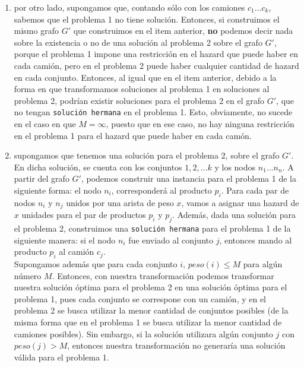 \documentclass[11pt, a4paper, twoside]{article}
\begin{document}
\begin{enumerate}
\begin{enumerate}
			      \item por otro lado, supongamos que, contando sólo con los camiones $c_{1} \dots c_{k}$, sabemos
			      que el problema 1 no tiene solución. Entonces, si construimos el mismo grafo $G'$ que construimos
			      en el item anterior, \textbf{no} podemos decir nada sobre la existencia o no de una solución
			      al problema 2 sobre el grafo $G'$, porque el problema 1 impone una restricción en el hazard que
			      puede haber en cada camión, pero en el problema 2 puede haber cualquier cantidad de hazard en cada
			      conjunto. Entonces, al igual que en el item anterior, debido a la forma en que transformamos soluciones
			      al problema 1 en soluciones al problema 2, podrían existir soluciones para el problema 2
			      en el grafo $G'$, que no tengan \texttt{solución hermana} en el problema 1. Esto, obviamente, no sucede
			      en el caso en que $M = \infty$, puesto que en ese caso, no hay ninguna restricción en el problema 1
			      para el hazard que puede haber en cada camón. 
			      
			      \item supongamos que tenemos una solución para el problema 2, sobre el grafo $G'$. En dicha 
			      solución, se cuenta con
			      los conjuntos $1, 2, \dots k$ y los nodos $n_{1} \dots n_{n}$. A partir del grafo $G'$, podemos
			      construir una instancia para el problema 1 de la siguiente forma: el nodo $n_{i}$, corresponderá
			      al producto $p_{i}$. Para cada par de nodos $n_{i}$ y $n_{j}$ unidos por una arista de peso $x$,
			      vamos a asignar una hazard de $x$ unidades para el par de productos $p_{i}$ y $p_{j}$. Además,
			      dada una solución para el problema 2, construimos una \texttt{solución hermana} para el problema 1
			      de la siguiente manera: si el nodo $n_{i}$ fue enviado al conjunto $j$, entonces mando al producto
			      $p_{i}$ al camión $c_{j}$. \\
			      Supongamos además que para cada conjunto $i$, $peso(i) \leq M$ para algún número $M$. Entonces, 
			      con nuestra transformación podemos transformar nuestra solución óptima para el problema 2 en una solución
			      óptima para el problema 1, pues cada conjunto se correspone con un camión, y en el problema 2 se busca
			      utilizar la menor cantidad de conjuntos posibles (de la misma forma que en el problema 1 se busca
			      utilizar la menor cantidad de camiones posibles). Sin embargo, si la solución utilizara algún
			      conjunto $j$ con $peso(j) > M$, entonces
			      nuestra transformación no generaría una solución válida para el problema 1.
			    

\end{enumerate}
\end{enumerate}
\end{document}
